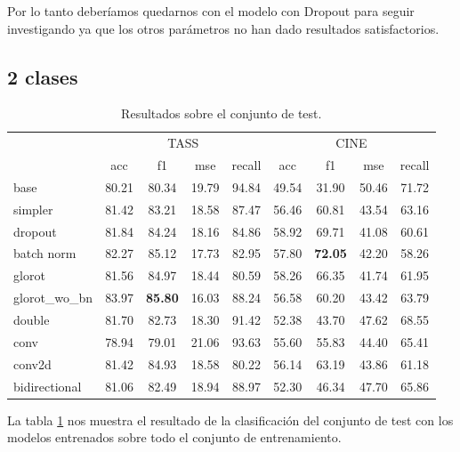 Por lo tanto deberíamos quedarnos con el modelo con Dropout para seguir investigando ya que los otros parámetros no han dado resultados satisfactorios.



\subsection{2 clases}

\begin{table}[H]
	\centering
	\begin{tabular}{|l|cccc|cccc|}
		\hline
		& \multicolumn{4}{c|}{TASS} & \multicolumn{4}{c|}{CINE} \\
		\cline{2-9}
		&    acc &     f1 &    mse &  recall & acc &     f1 &    mse &  recall \\
		\hline
		base          &  80.21 &  80.34 &  19.79 &   94.84 &  49.54 &  31.90 &  50.46 &   71.72 \\
		simpler       &  81.42 &  83.21 &  18.58 &   87.47 &  56.46 &  60.81 &  43.54 &   63.16 \\
		dropout  &  81.84 &  84.24 &  18.16 &   84.86 &  58.92 &  69.71 &  41.08 &   60.61\\
		batch norm    &  82.27 &  85.12 &  17.73 &   82.95 &  57.80 &  \textbf{72.05} &  42.20 &   58.26\\
		glorot        &  81.56 &  84.97 &  18.44 &   80.59  &  58.26 &  66.35 &  41.74 &   61.95\\
		glorot\_wo\_bn  &  83.97 &  \textbf{85.80} &  16.03 &   88.24 &  56.58 &  60.20 &  43.42 &   63.79\\
		double        &  81.70 &  82.73 &  18.30 &   91.42 &  52.38 &  43.70 &  47.62 &   68.55\\
		conv          &  78.94 &  79.01 &  21.06 &   93.63 &  55.60 &  55.83 &  44.40 &   65.41\\
		conv2d        &  81.42 &  84.93 &  18.58 &   80.22 &  56.14 &  63.19 &  43.86 &   61.18\\
		bidirectional &  81.06 &  82.49 &  18.94 &   88.97 &  52.30 &  46.34 &  47.70 &   65.86 \\
		\hline
	\end{tabular}
	\caption{Resultados sobre el conjunto de test.}
	\label{test-dl-2-clases}
\end{table}

La tabla \ref{test-dl-2-clases} nos muestra el resultado de la clasificación del conjunto de test con los  modelos entrenados sobre todo el conjunto de entrenamiento. 

